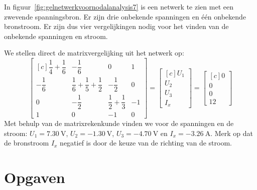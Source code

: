 \begin{example}
In figuur~\ref{fig:gelnetwerkvoornodalanalysis7} is een netwerk te zien met een zwevende spanningsbron. Er zijn drie onbekende spanningen en één onbekende bronstroom. Er zijn dus vier vergelijkingen nodig voor het vinden van de onbekende spanningen en stroom.

\begin{center}
\centering
{}
\label{fig:gelnetwerkvoornodalanalysis7}
\end{center}

We stellen direct de matrixvergelijking uit het netwerk op:
%
\begin{equation}
\begin{bmatrix*}[c]
\dfrac{1}{4}+\dfrac{1}{6} & -\dfrac{1}{6}  & 0 & 1 \\[1em]
-\dfrac{1}{6} & \dfrac{1}{6}+\dfrac{1}{5}+\dfrac{1}{2} & -\dfrac{1}{2} & 0 \\[1em] 
0 & -\dfrac{1}{2} & \dfrac{1}{2}+\dfrac{1}{3} & -1 \\[1em]
1 & 0 & -1 & 0
\end{bmatrix*} =
\begin{bmatrix*}[c]
U_1 \\[1em] U_2\\[1em] U_3\\[1em] I_x
\end{bmatrix*} = 
\begin{bmatrix*}[c]
0 \\[1em] 0 \\[1em] 0 \\[1em] 12
\end{bmatrix*}
\end{equation}
%
Met behulp van de matrixrekenkunde vinden we voor de spanningen en de stroom: $U_1 = \SI{7.30}{\volt}$, $U_2 = \SI{-1.30}{\volt}$, $U_3 = \SI{-4.70}{\volt}$ en $I_x = \SI{-3.26}{\ampere}$. Merk op dat de bronstroom $I_x$ negatief is door de keuze van de richting van de stroom.
\end{example}

\fi

\section{Opgaven}
